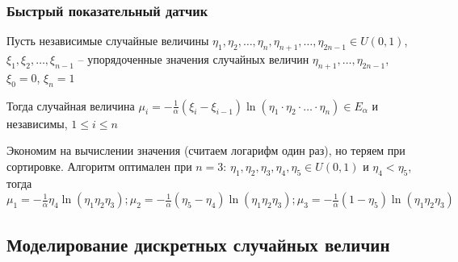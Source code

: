 \subsubsection{Быстрый показательный датчик}

\begin{MyTheorem}
    \Ths Пусть независимые случайные величины $\eta_1, \eta_2, \dots, \eta_n, \eta_{n+1}, \dots, \eta_{2n - 1} \in U(0, 1)$, $\xi_1, \xi_2, \dots, \xi_{n - 1}$ -- упорядоченные значения случайных величин $\eta_{n + 1}, \dots, \eta_{2n - 1}$, $\xi_0 = 0$, $\xi_n = 1$

    Тогда случайная величина $\mu_i = -\frac{1}{\alpha}(\xi_i - \xi_{i - 1}) \ln (\eta_1 \cdot \eta_2 \cdot \dots \cdot \eta_n) \in E_\alpha$ и независимы, $1 \leq i \leq n$
\end{MyTheorem}

Экономим на вычислении значения (считаем логарифм один раз), но теряем при сортировке. Алгоритм оптимален при $n = 3$: $\eta_1, \eta_2, \eta_3, \eta_4, \eta_5 \in U(0, 1)$ и $\eta_4 < \eta_5$, тогда $\mu_1 = -\frac{1}{\alpha} \eta_4 \ln (\eta_1 \eta_2 \eta_3); \mu_2 = -\frac{1}{\alpha} (\eta_5 - \eta_4) \ln (\eta_1 \eta_2 \eta_3); \mu_3 = -\frac{1}{\alpha} (1 - \eta_5) \ln (\eta_1 \eta_2 \eta_3)$

\subsection{Моделирование дискретных случайных величин}

